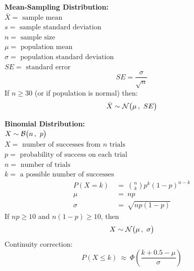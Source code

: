 \documentclass[12pt,letterpaper,addpoints]{exam}
\begin{document}
\begin{multicols}{2}
{\bf Mean-Sampling Distribution:}\\
$\bar{X} = \text{ sample mean}$\\
$s = \text{ sample standard deviation}$\\
$n = \text{ sample size}$\\
$\mu = \text{ population mean}$\\
$\sigma = \text{ population standard deviation}$\\
$SE = \text{ standard error}$
$$SE = \frac{\sigma}{\sqrt{n}} $$
If $n\ge 30$ (or if population is normal) then:
$$\bar{X} \sim \mathcal{N}\big(\mu\,,~SE\big) $$

\columnbreak

{\bf Binomial Distribution:}\\
$X \sim \mathcal{B}\big(n\,,~p\big)$\\
$X = \text{ number of successes from $n$ trials} $\\
$p = \text{ probability of success on each trial}$\\
$n = \text{ number of trials}$\\
$k = \text{ a possible number of successes}$
\begin{align*}
P(X=k) ~&=~ {n \choose k} p^k (1-p)^{n-k}\\
\mu ~&=~ np\\
\sigma ~&=~ \sqrt{np(1-p)} 
\end{align*}
If $np \ge 10$ and $n(1-p) \ge 10$, then
$$X \sim \mathcal{N}\big(\mu\,,~\sigma\big) $$
Continuity correction:
$$P(X \le k) ~\approx~ \Phi\left(\frac{k+0.5-\mu}{\sigma}\right)$$







\end{multicols}
\end{document}
